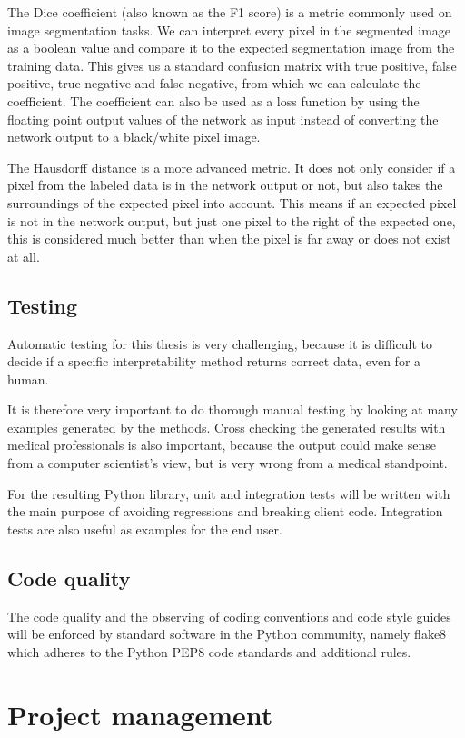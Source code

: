 The Dice coefficient (also known as the F1 score) is a metric commonly used on image segmentation tasks. We can interpret every pixel in the segmented image as a boolean value and compare it to the expected segmentation image from the training data. This gives us a standard confusion matrix with true positive, false positive, true negative and false negative, from which we can calculate the coefficient. The coefficient can also be used as a loss function by using the floating point output values of the network as input instead of converting the network output to a black/white pixel image.

The Hausdorff distance is a more advanced metric. It does not only consider if a pixel from the labeled data is in the network output or not, but also takes the surroundings of the expected pixel into account. This means if an expected pixel is not in the network output, but just one pixel to the right of the expected one, this is considered much better than when the pixel is far away or does not exist at all.

\subsection{Testing}
Automatic testing for this thesis is very challenging, because it is difficult to decide if a specific interpretability method returns correct data, even for a human.

It is therefore very important to do thorough manual testing by looking at many examples generated by the methods. Cross checking the generated results with medical professionals is also important, because the output could make sense from a computer scientist's view, but is very wrong from a medical standpoint.

For the resulting Python library, unit and integration tests will be written with the main purpose of avoiding regressions and breaking client code. Integration tests are also useful as examples for the end user.

\subsection{Code quality}
The code quality and the observing of coding conventions and code style guides will be enforced by standard software in the Python community, namely flake8 which adheres to the Python PEP8 code standards and additional rules.

\section{Project management}
